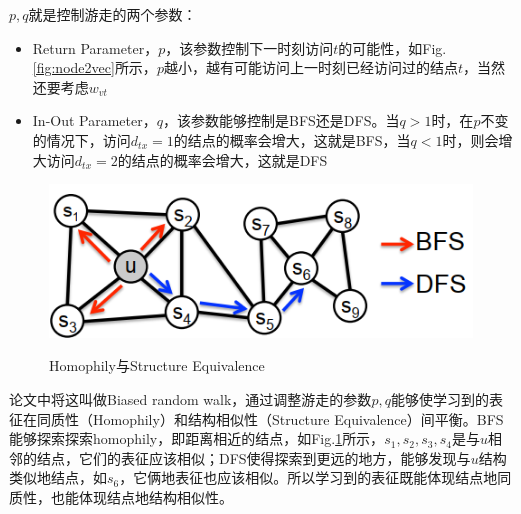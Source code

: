$p, q$就是控制游走的两个参数：
\begin{itemize}
	\item Return Parameter，$p$，该参数控制下一时刻访问$t$的可能性，如Fig.\ref{fig:node2vec}所示，$p$越小，越有可能访问上一时刻已经访问过的结点$t$，当然还要考虑$w_{vt}$
	\item In-Out Parameter，$q$，该参数能够控制是BFS还是DFS。当$q>1$时，在$p$不变的情况下，访问$d_{tx} = 1$的结点的概率会增大，这就是BFS，当$q<1$时，则会增大访问$d_{tx} = 2$的结点的概率会增大，这就是DFS
\end{itemize}
\begin{figure}[h]
	\centering
	\includegraphics[width=.8\textwidth]{pics/node2vec2.png}
	\label{fig:node2vec2}
	\caption{Homophily与Structure Equivalence}
\end{figure}

论文中将这叫做Biased random walk，通过调整游走的参数$p,q$能够使学习到的表征在同质性（Homophily）和结构相似性（Structure Equivalence）间平衡。BFS能够探索探索homophily，即距离相近的结点，如Fig.\ref{fig:node2vec2}所示，$s_1, s_2, s_3, s_4$是与$u$相邻的结点，它们的表征应该相似；DFS使得探索到更远的地方，能够发现与$u$结构类似地结点，如$s_6$，它俩地表征也应该相似。所以学习到的表征既能体现结点地同质性，也能体现结点地结构相似性。